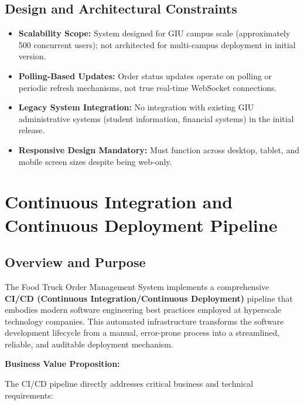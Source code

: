 \documentclass[12pt,a4paper]{article}
\begin{document}
\subsection{Design and Architectural Constraints}
\begin{itemize}[leftmargin=2em, itemsep=8pt]
    \item \textbf{Scalability Scope:} System designed for GIU campus scale (approximately 500 concurrent users); not architected for multi-campus deployment in initial version.
    \item \textbf{Polling-Based Updates:} Order status updates operate on polling or periodic refresh mechanisms, not true real-time WebSocket connections.
    \item \textbf{Legacy System Integration:} No integration with existing GIU administrative systems (student information, financial systems) in the initial release.
    \item \textbf{Responsive Design Mandatory:} Must function across desktop, tablet, and mobile screen sizes despite being web-only.
\end{itemize}

\newpage

\section{Continuous Integration and Continuous Deployment Pipeline}

\subsection{Overview and Purpose}

The Food Truck Order Management System implements a comprehensive \textbf{CI/CD (Continuous Integration/Continuous Deployment)} pipeline that embodies modern software engineering best practices employed at hyperscale technology companies. This automated infrastructure transforms the software development lifecycle from a manual, error-prone process into a streamlined, reliable, and auditable deployment mechanism.

\vspace{0.5em}

\textbf{Business Value Proposition:}

The CI/CD pipeline directly addresses critical business and technical requirements:
\end{document}
